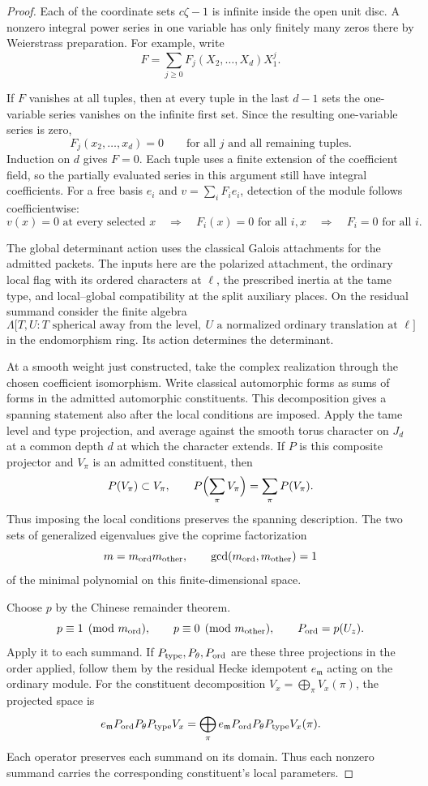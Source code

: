 \begin{proof}
Each of the coordinate sets \(c\zeta-1\) is infinite
inside the open unit disc. A nonzero integral power
series in one variable has only finitely many zeros
there by Weierstrass preparation. For example, write
\[
 F=\sum_{j\ge0}F_j(X_2,\ldots,X_d)X_1^j.
\]

If \(F\) vanishes at all tuples, then at every tuple in the
last \(d-1\) sets the one-variable series vanishes on the
infinite first set. Since the resulting one-variable series is zero,
\[
      F_j(x_2,\ldots,x_d)=0
      \qquad\text{for all }j\text{ and all remaining tuples}.
\]
Induction on \(d\) gives \(F=0\). Each tuple uses a finite extension of
the coefficient field, so the partially evaluated
series in this argument still have integral coefficients.
For a free basis \(e_i\) and \(v=\sum_i F_i e_i\), detection of the module follows coefficientwise:
\[
 v(x)=0\text{ at every selected }x\quad\Longrightarrow\quad
 F_i(x)=0\text{ for all }i,x\quad\Longrightarrow\quad F_i=0\text{ for all }i .
\]

The global determinant action uses the classical
Galois attachments for the admitted packets. The
inputs here are the polarized attachment, the
ordinary local flag with its ordered characters
at \(\ell\), the prescribed inertia at the tame
type, and local--global compatibility at the
split auxiliary places. On the residual summand consider the finite algebra
\[
 \Lambda\big[T,U:T\text{ spherical away from the level},
       \ U\text{ a normalized ordinary translation at }\ell\big]
\]
in the endomorphism ring. Its action determines the determinant.

At a smooth weight just constructed, take the complex realization through the chosen coefficient isomorphism.
Write classical automorphic forms as sums of forms
in the admitted automorphic constituents. This
decomposition gives a spanning statement also after
the local conditions are imposed. Apply the tame
level and type projection, and average against the
smooth torus character on \(J_d\) at a common depth
\(d\) at which the character extends. If \(P\) is this composite projector and \(V_\pi\) is an admitted constituent, then
\[
 P(V_\pi)\subset V_\pi,\qquad P\Bigl(\sum_\pi V_\pi\Bigr)=\sum_\pi P(V_\pi).
\]
Thus imposing the local conditions preserves the spanning description. The two sets of generalized eigenvalues give the coprime factorization
\[
 m=m_{\rm ord}m_{\rm other},\qquad \gcd(m_{\rm ord},m_{\rm other})=1
\]
of the minimal polynomial on this finite-dimensional space.

Choose \(p\) by the Chinese remainder theorem.
\[
 p\equiv1\pmod{m_{\rm ord}},\qquad
 p\equiv0\pmod{m_{\rm other}},\qquad P_{\rm ord}=p(U_z).
\] Apply it to each summand. If \(P_{\rm type},P_\theta,P_{\rm ord}\) are these three
projections in the order applied, follow them by the
residual Hecke idempotent \(e_{\mathfrak m}\) acting on
the ordinary module. For the constituent decomposition
\(V_x=\bigoplus_\pi V_x(\pi)\), the projected space is
\[
 e_{\mathfrak m}P_{\rm ord}P_\theta P_{\rm type}V_x
    =\bigoplus_\pi
          e_{\mathfrak m}P_{\rm ord}P_\theta P_{\rm type}V_x(\pi).
\]
Each operator preserves each summand on its domain. Thus each
nonzero summand carries the corresponding constituent's
local parameters.


\end{proof}
